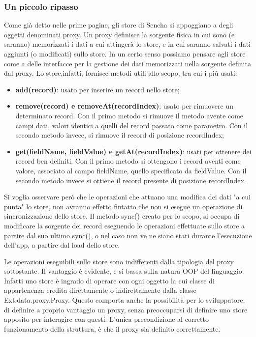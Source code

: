 \documentclass[10pt,a4paper,onecolumn]{article}
\begin{document}
\subsubsection{Un piccolo ripasso}

Come già detto nelle prime pagine, gli store di Sencha si appoggiano a degli oggetti denominati proxy. Un proxy definisce la sorgente fisica in cui sono (e saranno) memorizzati i dati a cui attingerà lo store, e in cui saranno salvati i dati aggiunti (o modificati) sullo store. In un certo senso possiamo pensare agli store come a delle interfacce per la gestione dei dati memorizzati nella sorgente definita dal proxy. Lo store,infatti, fornisce metodi utili allo scopo, tra cui i più usati:
\begin{itemize}
	\item \textbf{add(record)}: usato per inserire un record nello store;
	\item \textbf{remove(record) e removeAt(recordIndex)}: usato per rimuovere un determinato record. Con il primo metodo si rimuove il metodo avente come campi dati, valori identici a quelli del record passato come parametro. Con il secondo metodo invece, si rimuove il record di posizione recordIndex;
	\item \textbf{get(fieldName, fieldValue) e getAt(recordIndex)}: usati per ottenere dei record ben definiti. Con il primo metodo si ottengono i record aventi come valore, associato al campo fieldName, quello specificato da fieldValue. Con il secondo metodo invece si ottiene il record presente di posizione recordIndex.
\end{itemize}

Si voglia osservare però che le operazioni che attuano una modifica dei dati "a cui punta" lo store, non avranno effetto fintatto che non si esegue un operazione di sincronizzazione dello store. Il metodo sync() creato per lo scopo, si occupa di modificare la sorgente dei record eseguendo le operazioni effettuate sullo store a partire dal suo ultimo sync(), o nel caso non ve ne siano stati durante l'esecuzione dell'app, a partire dal load dello store.

Le operazioni eseguibili sullo store sono indifferenti dalla tipologia del proxy sottostante. Il vantaggio è evidente, e si bassa sulla natura OOP del linguaggio. Infatti uno store è ingrado di operare con ogni oggetto la cui classe di appartenenza eredita direttamente o indirettamente dalla classe Ext.data.proxy.Proxy. Questo comporta anche la possibilità per lo sviluppatore, di definire a proprio vantaggio un proxy, senza preoccuparsi di definire uno store apposito per interagire con questi. L'unica precondizione al corretto funzionamento della struttura, è che il proxy sia definito correttamente.
\end{document}
